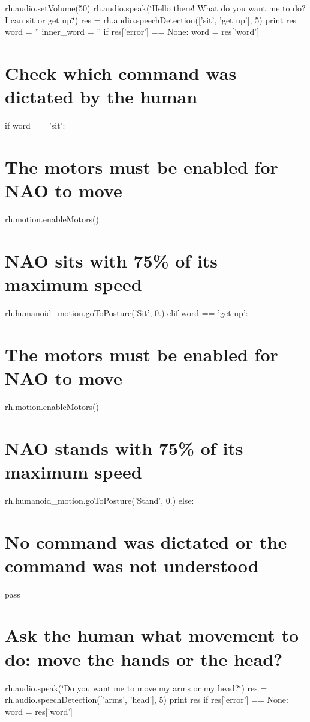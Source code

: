 rh.\-audio.\-set\-Volume(50) rh.\-audio.\-speak(\char`\"{}\-Hello there! What do you want me to do? I can sit or get up.\char`\"{}) res = rh.\-audio.\-speech\-Detection(\mbox{[}'sit', 'get up'\mbox{]}, 5) print res word = '' inner\-\_\-word = '' if res\mbox{[}'error'\mbox{]} == None\-: word = res\mbox{[}'word'\mbox{]}

\section*{Check which command was dictated by the human}

if word == 'sit'\-: \section*{The motors must be enabled for N\-A\-O to move}

rh.\-motion.\-enable\-Motors() \section*{N\-A\-O sits with 75\% of its maximum speed}

rh.\-humanoid\-\_\-motion.\-go\-To\-Posture('Sit', 0.) elif word == 'get up'\-: \section*{The motors must be enabled for N\-A\-O to move}

rh.\-motion.\-enable\-Motors() \section*{N\-A\-O stands with 75\% of its maximum speed}

rh.\-humanoid\-\_\-motion.\-go\-To\-Posture('Stand', 0.) else\-: \section*{No command was dictated or the command was not understood}

pass

\section*{Ask the human what movement to do\-: move the hands or the head?}

rh.\-audio.\-speak(\char`\"{}\-Do you want me to move my arms or my head?\char`\"{}) res = rh.\-audio.\-speech\-Detection(\mbox{[}'arms', 'head'\mbox{]}, 5) print res if res\mbox{[}'error'\mbox{]} == None\-: word = res\mbox{[}'word'\mbox{]}

